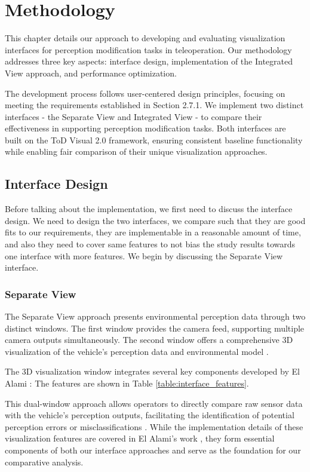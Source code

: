 
\chapter{Methodology}\label{chapter:methodology}
This chapter details our approach to developing and evaluating visualization interfaces for perception modification tasks in teleoperation. Our methodology addresses three key aspects: interface design, implementation of the Integrated View approach, and performance optimization.

The development process follows user-centered design principles, focusing on meeting the requirements established in Section 2.7.1. We implement two distinct interfaces - the Separate View and Integrated View - to compare their effectiveness in supporting perception modification tasks. Both interfaces are built on the ToD Visual 2.0 framework, ensuring consistent baseline functionality while enabling fair comparison of their unique visualization approaches.
\section{Interface Design}
Before talking about the implementation, we first need to discuss the interface design.
We need to design the two interfaces, we compare such that they are good fits to our requirements,
they are implementable in a reasonable amount of time, and also they need to cover same features
to not bias the study results towards one interface with more features. We begin by discussing the Separate View interface.



\subsection{Separate View}
The Separate View approach presents environmental perception data through two distinct windows. The first window provides the camera feed, supporting multiple camera outputs simultaneously. The second window offers a comprehensive 3D visualization of the vehicle's perception data and environmental model \cite{Kettwich}.

The 3D visualization window integrates several key components developed by El Alami \cite{yassinethesis}: The features are shown in Table \ref{table:interface_features}.

This dual-window approach allows operators to directly compare raw sensor data with the vehicle's perception outputs, facilitating the identification of potential perception errors or misclassifications \cite{Georg}. While the implementation details of these visualization features are covered in El Alami's work \cite{yassinethesis}, they form essential components of both our interface approaches and serve as the foundation for our comparative analysis.

